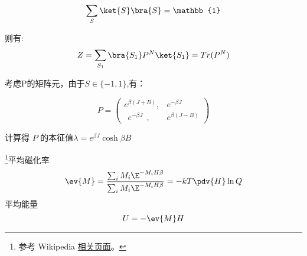 \begin{equation}
\sum_S\ket{S}\bra{S}=\mathbb{1}
\end{equation}

则有:
\begin{equation}
Z=\sum\limits_{S_1}\bra{S_1}P^N\ket{S_1}=Tr(P^N)
\end{equation}

考虑P的矩阵元，由于$S\in\{-1,1\}$,有：

$$P=\begin{pmatrix}
e^{\beta(J+B)},&e^{-\beta J} \\
~~e^{-\beta J}~~, & e^{\beta(J-B)}
\end{pmatrix}$$

计算得 $P$ 的本征值$\lambda=e^{\beta J}\cosh{\beta B}$
















\footnote{参考 Wikipedia \href{https://en.wikipedia.org/wiki/Ising_model}{相关页面}。}平均磁化率
\begin{equation}
\ev{M} = \frac{\sum_i M_i \E^{-M_i H \beta}}{\sum_i M_i \E^{-M_i H\beta}} = -kT \pdv{H} \ln Q
\end{equation}
平均能量
\begin{equation}
U = - \ev{M} H
\end{equation}
